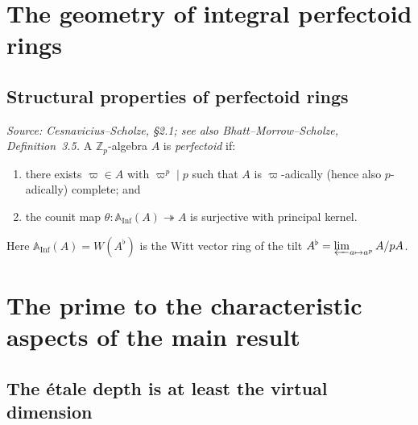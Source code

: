 \section{The geometry of integral perfectoid rings}

\subsection{Structural properties of perfectoid rings}

\begin{definition}
  \label{def:perfectoid_ring}
  \uses{}
%
  \textit{Source: Cesnavicius--Scholze, §2.1; see also Bhatt--Morrow--Scholze, Definition~3.5.}
  A \(\mathbb{Z}_p\)-algebra \(A\) is \emph{perfectoid} if:
  \begin{enumerate}
    \item there exists \(\varpi \in A\) with \(\varpi^p \mid p\) such that \(A\) is \(\varpi\)-adically (hence also \(p\)-adically) complete; and
    \item the counit map \(\theta \colon \mathbb{A}_{\mathrm{Inf}}(A) \twoheadrightarrow A\) is surjective with principal kernel.
  \end{enumerate}
  Here \(\mathbb{A}_{\mathrm{Inf}}(A) = W(A^{\flat})\) is the Witt vector ring of the tilt \(A^{\flat} = \varprojlim_{a \mapsto a^p} A/pA\).
\end{definition}

\section{The prime to the characteristic aspects of the main result}

\subsection{The \'{e}tale depth is at least the virtual dimension}

